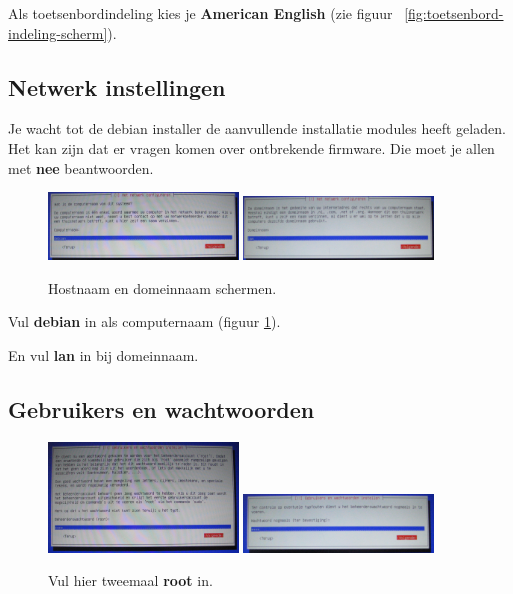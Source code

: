\documentclass[12pt,a4paper]{article}
\begin{document}
Als toetsenbordindeling kies je \textbf{American English} (zie figuur ~\ref{fig:toetsenbord-indeling-scherm}).


\subsection{Netwerk instellingen}
Je wacht tot de debian installer de aanvullende installatie modules heeft geladen. Het kan zijn dat er vragen komen over ontbrekende firmware. Die moet je allen met \textbf{nee} beantwoorden.

\begin{figure}[H]
\centering
\includegraphics[width=0.45\textwidth]{computernaam-scherm}
\includegraphics[width=0.45\textwidth]{domeinnaam-scherm}
\caption{Hostnaam en domeinnaam schermen.}
\label{fig:computernaam-scherm}
\end{figure}

Vul \textbf{debian} in als computernaam (figuur \ref{fig:computernaam-scherm}).

En vul \textbf{lan} in bij domeinnaam.


\subsection{Gebruikers en wachtwoorden}

\begin{figure}[H]
\centering
\includegraphics[width=0.45\textwidth]{root-wachtwoord-scherm}
\includegraphics[width=0.45\textwidth]{root-wachtwoord-bevestiging}
\caption{Vul hier tweemaal \textbf{root} in.}
\label{fig:root-wachtwoord-scherm}
\end{figure}
\end{document}
